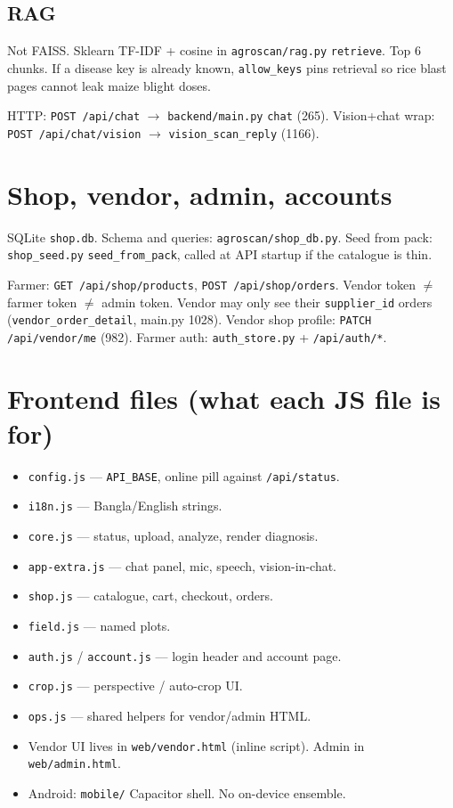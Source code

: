 \documentclass[Times,11pt,oneside,openany]{report}
\begin{document}
\section{RAG}
Not FAISS. Sklearn TF-IDF + cosine in \texttt{agroscan/rag.py} \texttt{retrieve}. Top 6 chunks. If a disease key is already known, \texttt{allow\_keys} pins retrieval so rice blast pages cannot leak maize blight doses.

HTTP: \texttt{POST /api/chat} $\rightarrow$ \texttt{backend/main.py} \texttt{chat} (265). Vision+chat wrap: \texttt{POST /api/chat/vision} $\rightarrow$ \texttt{vision\_scan\_reply} (1166).

\chapter{Shop, vendor, admin, accounts}
SQLite \texttt{shop.db}. Schema and queries: \texttt{agroscan/shop\_db.py}. Seed from pack: \texttt{shop\_seed.py} \texttt{seed\_from\_pack}, called at API startup if the catalogue is thin.

Farmer: \texttt{GET /api/shop/products}, \texttt{POST /api/shop/orders}. Vendor token $\neq$ farmer token $\neq$ admin token. Vendor may only see their \texttt{supplier\_id} orders (\texttt{vendor\_order\_detail}, main.py 1028). Vendor shop profile: \texttt{PATCH /api/vendor/me} (982). Farmer auth: \texttt{auth\_store.py} + \texttt{/api/auth/*}.

\chapter{Frontend files (what each JS file is for)}
\begin{itemize}
    \item \texttt{config.js} --- \texttt{API\_BASE}, online pill against \texttt{/api/status}.
    \item \texttt{i18n.js} --- Bangla/English strings.
    \item \texttt{core.js} --- status, upload, analyze, render diagnosis.
    \item \texttt{app-extra.js} --- chat panel, mic, speech, vision-in-chat.
    \item \texttt{shop.js} --- catalogue, cart, checkout, orders.
    \item \texttt{field.js} --- named plots.
    \item \texttt{auth.js} / \texttt{account.js} --- login header and account page.
    \item \texttt{crop.js} --- perspective / auto-crop UI.
    \item \texttt{ops.js} --- shared helpers for vendor/admin HTML.
    \item Vendor UI lives in \texttt{web/vendor.html} (inline script). Admin in \texttt{web/admin.html}.
    \item Android: \texttt{mobile/} Capacitor shell. No on-device ensemble.
\end{itemize}
\end{document}
